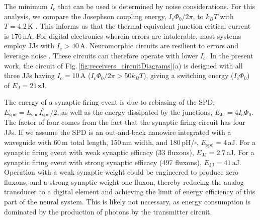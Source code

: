 \documentclass[twocolumn]{article}
\begin{document}
The minimum $I_{\mathrm{c}}$ that can be used is determined by noise considerations. For this analysis, we compare the Josephson coupling energy, $I_{\mathrm{c}}\Phi_0/2\pi$, to $k_B T$ with $T = 4.2$\,K \cite{lise1991}. This informs us that the thermal-equivalent junction critical current is 176\,nA. For digital electronics wherein errors are intolerable, most systems employ JJs with $I_{\mathrm{c}} > 40$\,\textmu A. Neuromorphic circuits are resilient to errors and leverage noise \cite{vrso1996,vora2005,stgo2005}. These circuits can therefore operate with lower $I_{\mathrm{c}}$. In the present work, the circuit of Fig.\,\ref{fig:receivers_circuitDiagrams}(a) is designed with all three JJs having $I_{\mathrm{c}} = 10$\,\textmu A ($I_{\mathrm{c}}\Phi_0/2\pi > 50 k_B T$), giving a switching energy ($I_{\mathrm{c}}\Phi_0$) of $E_{J} = 21$\,zJ.

The energy of a synaptic firing event is due to rebiasing of the SPD, $E_{\mathrm{spd}} = L_{\mathrm{spd}}I_{\mathrm{spd}}^2/2$, as well as the energy dissipated by the junctions, $E_{\mathrm{JJ}} = 4I_{\mathrm{c}}\Phi_0$. The factor of four comes from the fact that the synaptic firing circuit has four JJs. If we assume the SPD is an out-and-back nanowire integrated with a waveguide \cite{spga2011,pesc2012,feka2015,shbu2017b} with 60\,\textmu m total length, 150\,nm width, and 180\,pH/$\square$, $E_{\mathrm{spd}} = 4$\,aJ. For a synaptic firing event with weak synaptic efficacy (33 fluxons), $E_{\mathrm{JJ}} = 2.7$\,aJ. For a synaptic firing event with strong synaptic efficacy (497 fluxons), $E_{\mathrm{JJ}} = 41$\,aJ. Operation with a weak synaptic weight could be engineered to produce zero fluxons, and a strong synaptic weight one fluxon, thereby reducing the analog transducer to a digital element and achieving the limit of energy efficiency of this part of the neural system. This is likely not necessary, as energy consumption is dominated by the production of photons by the transmitter circuit.
	
\end{document}
